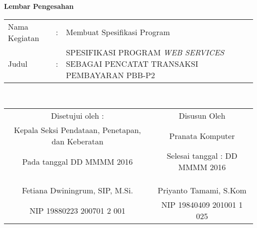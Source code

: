 \begin{center}
{\huge \bfseries Lembar Pengesahan}\\[0.4cm]

\begin{tabular}{l c p{10cm}}
  Nama Kegiatan & : & Membuat Spesifikasi Program \\
  Judul & : & SPESIFIKASI PROGRAM \textit{WEB SERVICES} SEBAGAI PENCATAT TRANSAKSI PEMBAYARAN PBB-P2 \\
\end{tabular}\\[2cm]

\begin{tabular}{c c}
  Disetujui oleh : & Disusun Oleh \\
  Kepala Seksi Pendataan, Penetapan, dan Keberatan & Pranata Komputer \\
  Pada tanggal DD MMMM 2016 & Selesai tanggal : DD MMMM 2016 \\
  & \\
  & \\
  & \\
  Fetiana Dwiningrum, SIP, M.Si. & Priyanto Tamami, S.Kom \\
  NIP 19880223 200701 2 001 & NIP 19840409 201001 1 025
\end{tabular}

\end{center}